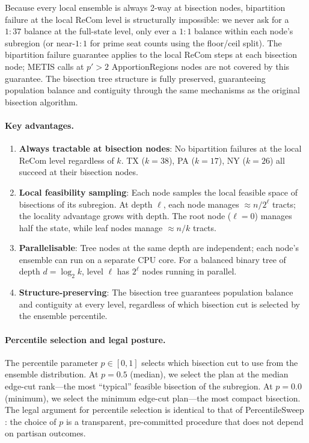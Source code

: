 Because every local ensemble is always 2-way at bisection nodes, bipartition
failure at the local ReCom level is structurally impossible: we never ask for
a $1:37$ balance at the full-state level, only ever a $1:1$ balance within each
node's subregion (or near-$1:1$ for prime seat counts using the floor/ceil split).
The bipartition failure guarantee applies to the local ReCom steps at each
bisection node; METIS calls at $p'>2$ ApportionRegions nodes are not covered
by this guarantee. The bisection tree structure is fully preserved, guaranteeing
population balance and contiguity through the same mechanisms as the original
bisection algorithm.

\paragraph{Key advantages.}
\begin{enumerate}
  \item \textbf{Always tractable at bisection nodes}: No bipartition failures
        at the local ReCom level regardless of $k$. TX ($k=38$), PA ($k=17$),
        NY ($k=26$) all succeed at their bisection nodes.
  \item \textbf{Local feasibility sampling}: Each node samples the local
        feasible space of bisections of its subregion. At depth $\ell$, each
        node manages $\approx n/2^\ell$ tracts; the locality advantage grows
        with depth. The root node ($\ell=0$) manages half the state, while
        leaf nodes manage $\approx n/k$ tracts.
  \item \textbf{Parallelisable}: Tree nodes at the same depth are independent;
        each node's ensemble can run on a separate CPU core. For a balanced
        binary tree of depth $d = \log_2 k$, level $\ell$ has $2^\ell$ nodes
        running in parallel.
  \item \textbf{Structure-preserving}: The bisection tree guarantees population
        balance and contiguity at every level, regardless of which bisection cut
        is selected by the ensemble percentile.
\end{enumerate}

\paragraph{Percentile selection and legal posture.}
The percentile parameter $p \in [0, 1]$ selects which bisection cut to use from
the ensemble distribution. At $p = 0.5$ (median), we select the plan at the
median edge-cut rank---the most ``typical'' feasible bisection of the subregion.
At $p = 0.0$ (minimum), we select the minimum edge-cut plan---the most compact
bisection. The legal argument for percentile selection is identical to that of
PercentileSweep \citep{dellaLibera2026percentilesweep}: the choice of $p$ is
a transparent, pre-committed procedure that does not depend on partisan outcomes.

